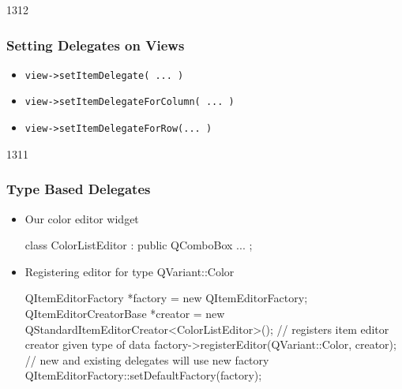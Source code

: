 \begin{slide}{1312}
  \frametitle{Setting Delegates on Views}
  \begin{itemize}
  \item \texttt{view->setItemDelegate( ... )}
  \item \texttt{view->setItemDelegateForColumn( ... )}
  \item \texttt{view->setItemDelegateForRow(... )}
 \end{itemize}
\end{slide}

\begin{slide}[fragile]{1311}
  \frametitle{Type Based Delegates}
\begin{itemize}
\item Our color editor widget
\begin{cpp}
class ColorListEditor : public QComboBox {
 ...
}; 
\end{cpp}
\medskip
\item Registering editor for type QVariant::Color
\begin{cpp}
QItemEditorFactory *factory = new QItemEditorFactory;
QItemEditorCreatorBase *creator = 
        new QStandardItemEditorCreator<ColorListEditor>();
// registers item editor creator given type of data
factory->registerEditor(QVariant::Color, creator);
// new and existing delegates will use new factory
QItemEditorFactory::setDefaultFactory(factory);
\end{cpp}
\end{itemize}
\end{slide}

